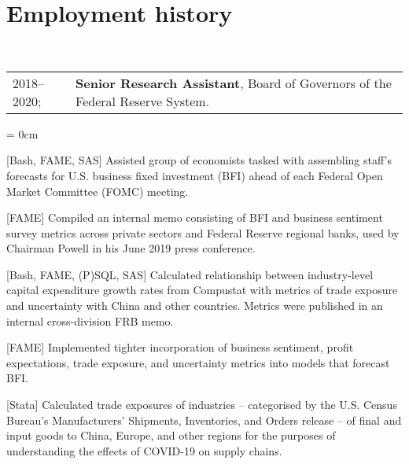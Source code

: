 \documentclass[a4paper, 11pt]{article}
\begin{document}
  \section{Employment history}
  ~\begin{tabular}{ll}
    2018--2020; & \textbf{Senior Research Assistant}, Board of Governors of the Federal Reserve System.
  \end{tabular}
  \begin{compactitem}\parskip = 0cm
    \item {[Bash, FAME, SAS]} Assisted group of economists tasked with assembling staff's forecasts for U.S. business fixed investment (BFI) ahead of each Federal Open Market Committee (FOMC) meeting.
    \item {[FAME]} Compiled an internal memo consisting of BFI and business sentiment survey metrics across private sectors and Federal Reserve regional banks, used by Chairman Powell in his June 2019 press conference.
    \item {[Bash, FAME, (P)SQL, SAS]} Calculated relationship between industry-level capital expenditure growth rates from Compustat with metrics of trade exposure and uncertainty with China and other countries. Metrics were published in an internal cross-division FRB memo.
    \item {[FAME]} Implemented tighter incorporation of business sentiment, profit expectations, trade exposure, and uncertainty metrics into models that forecast BFI.
    \item {[Stata]} Calculated trade exposures of industries -- categorised by the U.S. Census Bureau's Manufacturers' Shipments, Inventories, and Orders release -- of final and input goods to China, Europe, and other regions for the purposes of understanding the effects of COVID-19 on supply chains.
  \end{compactitem}
  \vspace*{1em}
      
\end{document}
